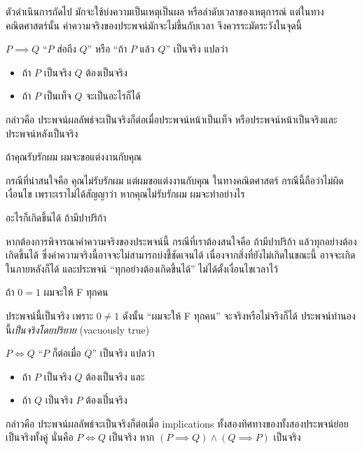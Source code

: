 ตัวดำเนินการถัดไป มักจะใช้บ่งความเป็นเหตุเป็นผล หรือลำดับเวลาของเหตุการณ์  แต่ในทางคณิตศาสตร์นั้น ค่าความจริงของประพจน์มักจะไม่ขึ้นกับเวลา จึงควรระมัดระวังในจุดนี้
\begin{definition}[implies]
$P\implies Q$ ``$P$ ส่อถึง $Q$'' หรือ ``ถ้า $P$ แล้ว $Q$'' เป็นจริง แปลว่า
\begin{itemize}
\item ถ้า $P$ เป็นจริง $Q$ ต้องเป็นจริง
\item ถ้า $P$ เป็นเท็จ $Q$ จะเป็นอะไรก็ได้
\end{itemize}
กล่าวคือ ประพจน์ผลลัพธ์จะเป็นจริงก็ต่อเมื่อประพจน์หน้าเป็นเท็จ หรือประพจน์หน้าเป็นจริงและประพจน์หลังเป็นจริง
\end{definition}

\begin{example}
ถ้าคุณรับรักผม ผมจะขอแต่งงานกับคุณ
\end{example}
กรณีที่น่าสนใจคือ คุณไม่รับรักผม แต่ผมขอแต่งงานกับคุณ ในทางคณิตศาสตร์ กรณีนี้ถือว่าไม่ผิดเงื่อนไข เพราะเราไม่ได้สัญญาว่า หากคุณไม่รับรักผม ผมจะทำอย่างไร

\begin{example}
อะไรก็เกิดขึ้นได้ ถ้ามีปาปริก้า
\end{example}
หากต้องการพิจารณาค่าความจริงของประพจน์นี้ กรณีที่เราต้องสนใจคือ ถ้ามีปาปริก้า แล้วทุกอย่างต้องเกิดขึ้นได้ ซึ่งค่าความจริงนี้อาจจะไม่สามารถบ่งชี้ชัดเจนได้ เนื่องจากสิ่งที่ยังไม่เกิดในขณะนี้ อาจจะเกิดในภายหลังก็ได้ และประพจน์ ``ทุกอย่างต้องเกิดขึ้นได้'' ไม่ได้ตั้งเงื่อนไขเวลาไว้

\begin{example}
ถ้า $0=1$ ผมจะให้ F ทุกคน
\end{example}
ประพจน์นี้เป็นจริง เพราะ $0\neq 1$ ดังนั้น ``ผมจะให้ F ทุกคน'' จะจริงหรือไม่จริงก็ได้ ประพจน์ทำนองนี้\emph{เป็นจริงโดยปริยาย} (vacuously true)

\begin{definition}
$P\iff Q$ ``$P$ ก็ต่อเมื่อ $Q$'' เป็นจริง แปลว่า
\begin{itemize}
    \item ถ้า $P$ เป็นจริง $Q$ ต้องเป็นจริง และ
    \item ถ้า $Q$ เป็นจริง $P$ ต้องเป็๋นจริง
\end{itemize}
กล่าวคือ ประพจน์ผลลัพธ์จะเป็นจริงก็ต่อเมื่อ implications ทั้งสองทิศทางของทั้งสองประพจน์ย่อยเป็นจริงทั้งคู่ นั่นคือ $P\iff Q$ เป็นจริง หาก $(P\implies Q)\wedge(Q\implies P)$ เป็นจริง
\end{definition}


